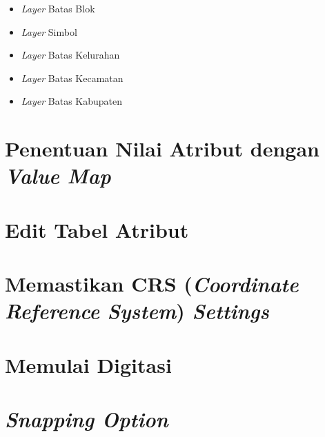 \begin{itemize}
  \item \textit{Layer} Batas Blok
  
  \item \textit{Layer} Simbol
  
  \item \textit{Layer} Batas Kelurahan
  
  \item \textit{Layer} Batas Kecamatan
  
  \item \textit{Layer} Batas Kabupaten

\end{itemize}

\section{Penentuan Nilai Atribut dengan \textit{Value Map}}

\section{Edit Tabel Atribut}

\section{Memastikan CRS (\textit{Coordinate Reference System}) \textit{Settings}}

\section{Memulai Digitasi}

\section{\textit{Snapping Option}}